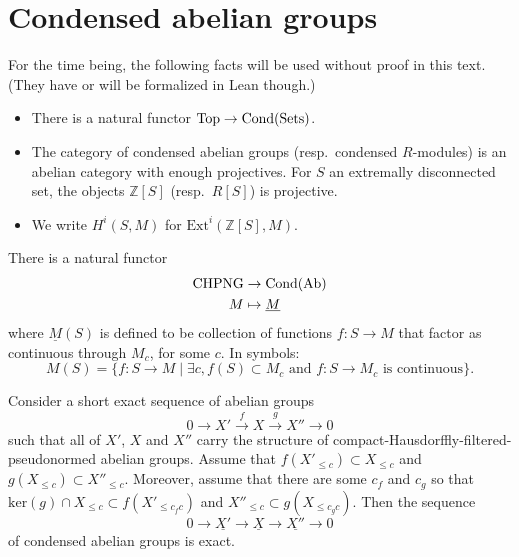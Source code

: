 \section{Condensed abelian groups}

\begin{remark}
  For the time being, the following facts will be used without proof in this text.
  (They have or will be formalized in Lean though.)

  \begin{itemize}
    \item There is a natural functor $\operatorname{Top} \to \operatorname{Cond}(\operatorname{Sets})$.
    \item The category of condensed abelian groups (resp.~condensed $R$-modules)
      is an abelian category with enough projectives.
      For $S$ an extremally disconnected set, the objects $\mathbb Z[S]$ (resp.~$R[S]$) is projective.
    \item We write $H^i(S, M)$ for $\text{Ext}^i(\mathbb Z[S], M)$.
  \end{itemize}
\end{remark}

\begin{definition}
  \label{CHPNG-to-Cond}
  There is a natural functor
  \begin{align*}
    \text{CHPNG} &\to \operatorname{Cond}(\operatorname{Ab}) \\
    M &\mapsto \underline{M}
  \end{align*}
  where $\underline{M}(S)$ is defined to be collection of functions $f \colon S \to M$ that factor as continuous through $M_c$, for some $c$.
  In symbols:
  \[ M(S) = \{f \colon S \to M \mid \exists c, f(S) \subset M_c \text{ and $f \colon S \to M_c$ is continuous}\}. \]
\end{definition}

\begin{proposition}
  \label{CHPNG-Cond-exact}
  Consider a short exact sequence of abelian groups
  \[ 0\to X'\xrightarrow{f} X\xrightarrow{g} X''\to 0 \]
  such that all of $X'$, $X$ and $X''$ carry the structure of compact-Hausdorffly-filtered-pseudonormed abelian groups.
  Assume that $f(X'_{\leq c})\subset X_{\leq c}$ and $g(X_{\leq c})\subset X''_{\leq c}$.
  Moreover, assume that there are some $c_f$ and $c_g$
  so that $\mathrm{ker}(g)\cap X_{\leq c}\subset f(X'_{\leq c_fc})$ and $X''_{\leq c}\subset g(X_{\leq c_gc})$.
  Then the sequence
  \[ 0\to \underline{X'}\to \underline{X}\to \underline{X''}\to 0 \]
  of condensed abelian groups is exact.
\end{proposition}

